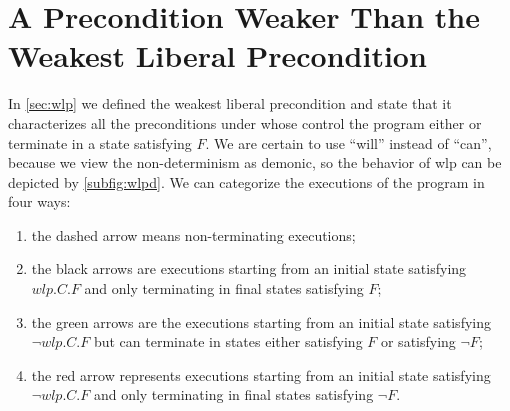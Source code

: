 \section{A Precondition Weaker Than the Weakest Liberal Precondition}
In \autoref{sec:wlp} we defined the weakest liberal precondition and state that it characterizes all the preconditions under whose control the program either  or  terminate in a state satisfying $F$. 
We are certain to use ``will'' instead of ``can'', because we view the non-determinism as demonic, so the behavior of wlp can be depicted by \autoref{subfig:wlpd}. 
We can categorize the executions of the program in four ways: 
\begin{enumerate}
	\item the dashed arrow means non-terminating executions; 
	\item the black arrows are executions starting from an initial state satisfying $wlp.C.F$ and only terminating in final states satisfying $F$; 
	\item the green arrows are the executions starting from an initial state satisfying $\neg wlp.C.F$ but can terminate in states either satisfying $F$ or satisfying $\neg F$;
	\item the red arrow represents executions starting from an initial state satisfying $\neg wlp.C.F$ and only terminating in final states satisfying $\neg F$. 
\end{enumerate}


